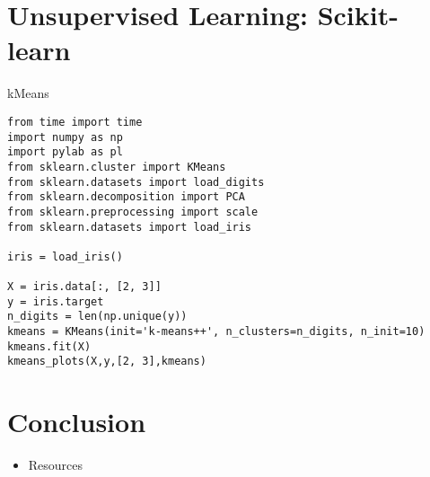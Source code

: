 \section{Unsupervised Learning:
Scikit-learn}\label{unsupervised-learning-scikit-learn}

\begin{frame}[fragile]{kMeans}

\begin{verbatim}
from time import time
import numpy as np
import pylab as pl
from sklearn.cluster import KMeans
from sklearn.datasets import load_digits
from sklearn.decomposition import PCA
from sklearn.preprocessing import scale
from sklearn.datasets import load_iris

iris = load_iris()

X = iris.data[:, [2, 3]]
y = iris.target
n_digits = len(np.unique(y))
kmeans = KMeans(init='k-means++', n_clusters=n_digits, n_init=10)
kmeans.fit(X)
kmeans_plots(X,y,[2, 3],kmeans)
\end{verbatim}

\end{frame}

\section{Conclusion}\label{conclusion}

\begin{itemize}
\itemsep1pt\parskip0pt
\item
  Resources
\end{itemize}
